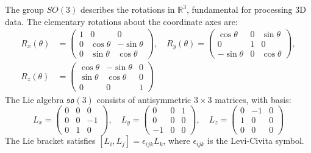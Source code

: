 \begin{example}\label{ex:so3_rotaciones}
The group $SO(3)$ describes the rotations in $\mathbb{R}^3$, fundamental for processing 3D data. The elementary rotations about the coordinate axes are:
\begin{align}
R_x(\theta) &= \begin{pmatrix}
1 & 0 & 0 \\
0 & \cos\theta & -\sin\theta \\
0 & \sin\theta & \cos\theta
\end{pmatrix}, \quad
R_y(\theta) = \begin{pmatrix}
\cos\theta & 0 & \sin\theta \\
0 & 1 & 0 \\
-\sin\theta & 0 & \cos\theta
\end{pmatrix}, \\
R_z(\theta) &= \begin{pmatrix}
\cos\theta & -\sin\theta & 0 \\
\sin\theta & \cos\theta & 0 \\
0 & 0 & 1
\end{pmatrix}
\end{align}
The Lie algebra $\mathfrak{so}(3)$ consists of antisymmetric $3 \times 3$ matrices, with basis:
\begin{equation}
L_x = \begin{pmatrix}
0 & 0 & 0 \\
0 & 0 & -1 \\
0 & 1 & 0
\end{pmatrix}, \quad
L_y = \begin{pmatrix}
0 & 0 & 1 \\
0 & 0 & 0 \\
-1 & 0 & 0
\end{pmatrix}, \quad
L_z = \begin{pmatrix}
0 & -1 & 0 \\
1 & 0 & 0 \\
0 & 0 & 0
\end{pmatrix}
\end{equation}
The Lie bracket satisfies $[L_i, L_j] = \epsilon_{ijk} L_k$, where $\epsilon_{ijk}$ is the Levi-Civita symbol.
\end{example}


